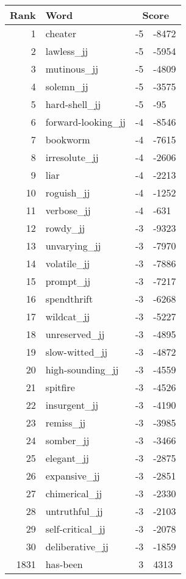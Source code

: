 \begin{longtable}[!htbp]{| rlr@{.}l |}
    \hline
    \textbf{Rank} & \textbf{Word} & \multicolumn{2}{c|}{\textbf{Score}} \\
    \hline
    \endhead
    1 & cheater & -5 & -8472 \\
    2 & lawless\_jj & -5 & -5954 \\
    3 & mutinous\_jj & -5 & -4809 \\
    4 & solemn\_jj & -5 & -3575 \\
    5 & hard-shell\_jj & -5 & -95 \\
    6 & forward-looking\_jj & -4 & -8546 \\
    7 & bookworm & -4 & -7615 \\
    8 & irresolute\_jj & -4 & -2606 \\
    9 & liar & -4 & -2213 \\
    10 & roguish\_jj & -4 & -1252 \\
    11 & verbose\_jj & -4 & -631 \\
    12 & rowdy\_jj & -3 & -9323 \\
    13 & unvarying\_jj & -3 & -7970 \\
    14 & volatile\_jj & -3 & -7886 \\
    15 & prompt\_jj & -3 & -7217 \\
    16 & spendthrift & -3 & -6268 \\
    17 & wildcat\_jj & -3 & -5227 \\
    18 & unreserved\_jj & -3 & -4895 \\
    19 & slow-witted\_jj & -3 & -4872 \\
    20 & high-sounding\_jj & -3 & -4559 \\
    21 & spitfire & -3 & -4526 \\
    22 & insurgent\_jj & -3 & -4190 \\
    23 & remiss\_jj & -3 & -3985 \\
    24 & somber\_jj & -3 & -3466 \\
    25 & elegant\_jj & -3 & -2875 \\
    26 & expansive\_jj & -3 & -2851 \\
    27 & chimerical\_jj & -3 & -2330 \\
    28 & untruthful\_jj & -3 & -2103 \\
    29 & self-critical\_jj & -3 & -2078 \\
    30 & deliberative\_jj & -3 & -1859 \\
    1831 & has-been & 3 & 4313 \\

\end{longtable}
